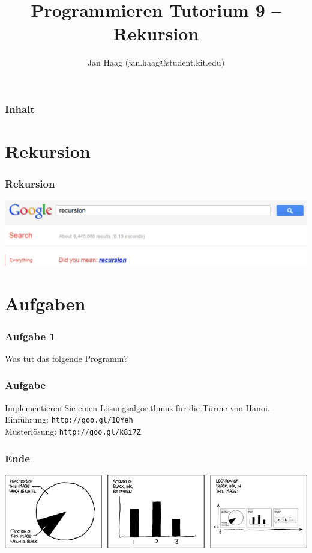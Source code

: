 \documentclass{beamer}
\author{Jan Haag (jan.haag@student.kit.edu)}
\title{Programmieren Tutorium 9 -- Rekursion}
\institute{Institut f\"{u}r Zeritfizierbare und Vertrauensw\"{u}rdige Informatiksysteme (ZVI)}
\begin{document}
\begin{frame}
\maketitle
\end{frame}

\begin{frame}
\frametitle{Inhalt}
\tableofcontents
\end{frame}

\section{Rekursion}
\begin{frame}
\frametitle{Rekursion}
\includegraphics[scale=0.5]{rekursion.pdf}
\end{frame}

\section{Aufgaben}
\begin{frame}
\frametitle{Aufgabe 1}
Was tut das folgende Programm?
\end{frame}

\begin{frame}[shrink=15]

\end{frame}

\begin{frame}[fragile]
\frametitle{Aufgabe}
Implementieren Sie einen L\"{o}sungsalgorithmus f\"{u}r die
T\"{u}rme von Hanoi.\\
Einf\"{u}hrung: \verb|http://goo.gl/1QYeh|\\
Musterl\"{o}sung: \verb|http://goo.gl/k8i7Z|\\
\end{frame}

\begin{frame}
\frametitle{Ende}
\includegraphics[scale=0.4]{self_description.png}
\end{frame}
\end{document}
